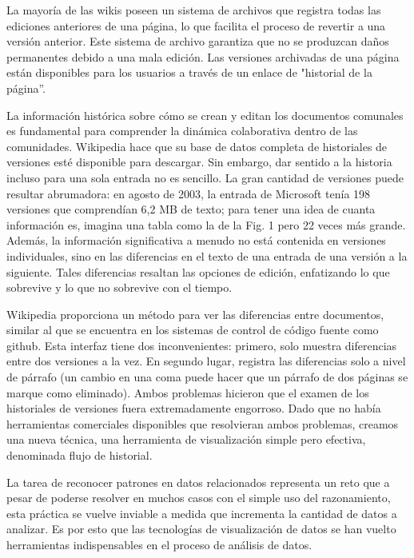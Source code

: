 
La mayoría de las wikis poseen un sistema de archivos que registra todas las ediciones anteriores de una página, lo que facilita el proceso de revertir a una versión anterior. Este sistema de archivo garantiza que no se produzcan daños permanentes debido a una mala edición. Las versiones archivadas de una página están disponibles para los usuarios a través de un enlace de "historial de la página”.

La información histórica sobre cómo se crean y editan los documentos comunales es fundamental para comprender la dinámica colaborativa dentro de las comunidades. Wikipedia hace que su base de datos completa de historiales de versiones esté disponible para descargar. Sin embargo, dar sentido a la historia incluso para una sola entrada no es sencillo. La gran cantidad de versiones puede resultar abrumadora: en agosto de 2003, la entrada de Microsoft tenía 198 versiones que comprendían 6,2 MB de texto; para tener una idea de cuanta información es, imagina una tabla como la de la Fig. 1 pero 22 veces más grande. Además, la información significativa a menudo no está contenida en versiones individuales, sino en las diferencias en el texto de una entrada de una versión a la siguiente. Tales diferencias resaltan las opciones de edición, enfatizando lo que sobrevive y lo que no sobrevive con el tiempo.

Wikipedia proporciona un método para ver las diferencias entre documentos, similar al que se encuentra en los sistemas de control de código fuente como github. Esta interfaz tiene dos inconvenientes: primero, solo muestra diferencias entre dos versiones a la vez. En segundo lugar, registra las diferencias solo a nivel de párrafo (un cambio en una coma puede hacer que un párrafo de dos páginas se marque como eliminado). Ambos problemas hicieron que el examen de los historiales de versiones fuera extremadamente engorroso. Dado que no había herramientas comerciales disponibles que resolvieran ambos problemas, creamos una nueva técnica, una herramienta de visualización simple pero efectiva, denominada flujo de historial.

La tarea de reconocer patrones en datos relacionados representa un reto que a pesar de poderse resolver en muchos casos con el simple uso del razonamiento, esta práctica se vuelve inviable a medida que incrementa la cantidad de datos a analizar. Es por esto que las tecnologías de visualización de datos se han vuelto herramientas indispensables en el proceso de análisis de datos. 